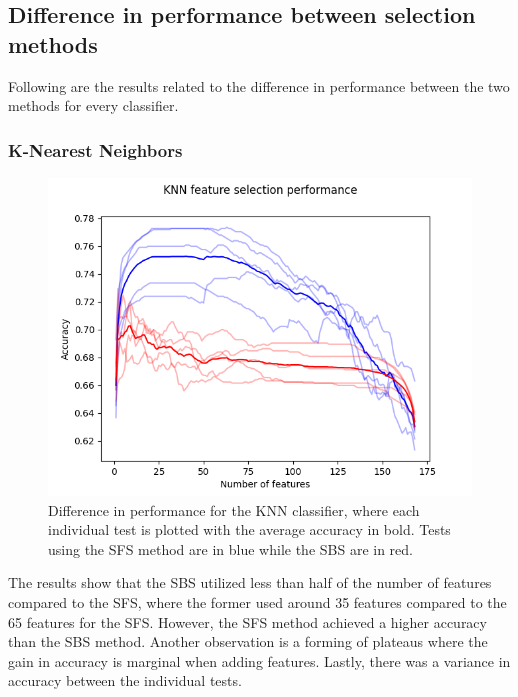 \documentclass{kththesis}
\begin{document}
\subsection{Difference in performance between selection methods}

Following are the results related to the difference in performance between the two methods for every classifier.

\subsubsection{K-Nearest Neighbors}

\begin{figure}[h!]
  \begin{center}
    \includegraphics[scale=0.8]{../new_plots/knn_graph.png}
    \caption{Difference in performance for the KNN classifier, where each individual test is plotted with the average accuracy in bold. Tests using the SFS method are in blue while the SBS are in red. }
  \end{center}
\end{figure}

The results show that the SBS utilized less than half of the number of features compared to the SFS, where the former used around 35 features compared to the 65 features for the SFS. However, the SFS method achieved a higher accuracy than the SBS method. Another observation is a forming of plateaus where the gain in accuracy is marginal when adding features. Lastly, there was a variance in accuracy between the individual tests.

\newpage
\end{document}
